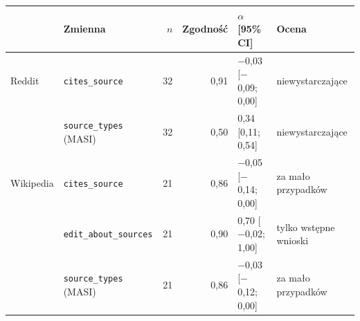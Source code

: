 \begin{tabular}{llrrll}
\toprule
 & Zmienna & $n$ & Zgodność & $\alpha$ [95\% CI] & Ocena \\
\midrule
Reddit & \texttt{cites\_source} & 32 & 0{,}91 & $-$0{,}03 [$-$0{,}09; 0{,}00] & niewystarczające \\
 & \texttt{source\_types} (MASI) & 32 & 0{,}50 & 0{,}34 [0{,}11; 0{,}54] & niewystarczające \\
\midrule
Wikipedia & \texttt{cites\_source} & 21 & 0{,}86 & $-$0{,}05 [$-$0{,}14; 0{,}00] & za mało przypadków \\
 & \texttt{edit\_about\_sources} & 21 & 0{,}90 & 0{,}70 [$-$0{,}02; 1{,}00] & tylko wstępne wnioski \\
 & \texttt{source\_types} (MASI) & 21 & 0{,}86 & $-$0{,}03 [$-$0{,}12; 0{,}00] & za mało przypadków \\
\bottomrule
\end{tabular}
